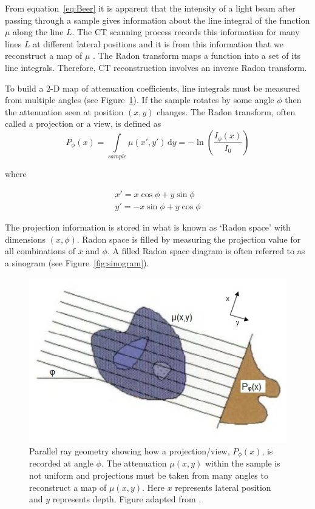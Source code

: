 \documentclass[12pt]{article}
\begin{document}
From equation~\ref{eq:Beer} it is apparent that  the  intensity of a light beam after passing through a sample gives information about the line integral of the function $\mu$  along the line $L$. The CT scanning process records this information for many lines $L$ at different lateral positions and it is from this information that we reconstruct a map of $\mu$ \cite{natterer2001mathematics}.
The Radon transform maps a function into a set of its line integrals. Therefore, CT reconstruction involves an inverse Radon transform.



To build  a 2-D map of attenuation coefficients, line integrals must be measured from multiple angles (see Figure~\ref{fig:projection}). If the sample rotates by some angle $\phi$ then the attenuation seen at position $(x, y)$  changes.
The Radon transform, often called a projection or a view, is defined as
\begin{equation}
P_{\phi}(x) = \int\limits_{sample} \mu(x',y')\, \mathrm{d}y = -\ln\left(\frac{I_{\phi}(x)}{I_0}\right)
\end{equation}

where 

\begin{equation}
\begin{aligned}
x' = x\cos\phi + y\sin\phi \\
y' = -x\sin\phi + y\cos\phi
\end{aligned}
\end{equation}

The projection information is stored in what is known as `Radon space' with dimensions $(x, \phi)$. Radon space is filled by measuring the projection value for all combinations of $x$ and $\phi$. A filled Radon space diagram is often referred to as a sinogram (see Figure~\ref{fig:sinogram}).

\begin{figure}[H]
\centering
\includegraphics[scale=0.8]{Russ_projection.jpg}
\caption{Parallel ray geometry showing how a projection/view, $P_{\phi}(x)$, is recorded at angle $\phi$. The attenuation $\mu(x,y)$ within the sample is not uniform and projections must be taken from many angles to reconstruct a map of $\mu(x,y)$.  Here $x$ represents lateral position  and $y$ represents  depth. Figure adapted from \cite{russ2002image}.}
\label{fig:projection}
\end{figure}
\end{document}
